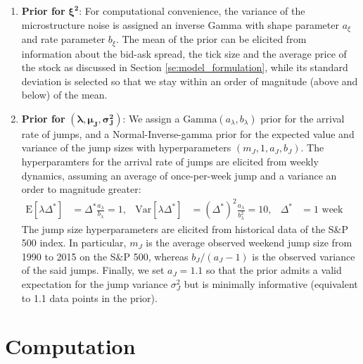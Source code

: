 \documentclass[10pt]{article}
\newcommand{\E}[1]{\mbox{E}\left[#1\right]}
\newcommand{\Var}[1]{\mbox{Var}\left[#1\right]}
\begin{document}
\begin{enumerate}[]

\item{\textbf{Prior for} $\boldsymbol{\xi^2}$:}  For computational convenience, the variance of the microstructure noise is assigned an inverse Gamma with shape parameter $a_{\xi}$ and rate parameter $b_{\xi}$.  The mean of the prior can be elicited from information about the bid-ask spread, the tick size and the average price of the stock as discussed in Section \ref{se:model_formulation}, while its standard deviation is selected so that we stay within an order of magnitude (above and below) of the mean.


\item{\textbf{Prior for} $(\boldsymbol{\lambda}, \boldsymbol{\mu_J}, \boldsymbol{\sigma^2_J})$:} We assign a $\mbox{Gamma}(a_\lambda,b_\lambda)$ prior for the arrival rate of jumps, and a Normal-Inverse-gamma prior for the expected value and variance of the jump sizes with hyperparameters $(m_J, 1, a_J, b_J)$. The hyperparamters for the arrival rate of jumps are elicited from weekly dynamics, assuming an average of once-per-week jump and a variance an order to magnitude greater:
  \begin{align}
    \E{\lambda \Delta^*} &= \Delta^* \frac{a_\lambda}{b_\lambda} = 1, & \Var{\lambda \Delta^*} &= (\Delta^*)^2 \frac{a_\lambda}{b_\lambda^2} = 10, & \Delta^* &= 1 \mbox{ week (milliseconds).}
  \end{align}
  The jump size hyperparameters are elicited from historical data of the S\&P 500 index. In particular, $m_J$ is the average observed weekend jump size from 1990 to 2015 on the S\&P 500, whereas $b_J/(a_J-1)$ is the observed  variance of the said jumps. Finally, we set $a_J = 1.1$ so that the prior admits a valid expectation for the jump variance $\sigma_J^2$ but is minimally informative (equivalent to 1.1 data points in the prior).

\end{enumerate}


\section{Computation}\label{se:computation}
\end{document}
